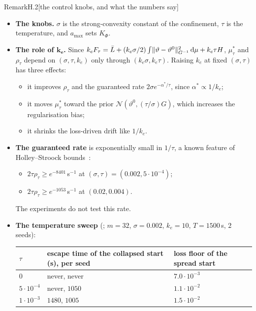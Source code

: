 \begin{rmk}{Remark}{H.2}[the control knobs, and what the numbers say]
\leavevmode
\begin{itemize}
  \item \textbf{The knobs.} $\sigma$ is the strong-convexity constant of the confinement, $\tau$ is the temperature,
  and $a_{\max}$ sets $K_\Phi$.
  \item \textbf{The role of $\bm{k_e}$.} Since
  $k_e F_\tau = \bar L + (k_e\sigma/2)\int\lVert \vartheta - \vartheta^0\rVert^2_{G^{-1}}\,\mathrm{d}\mu + k_e\tau H$,
  $\mu^*_\tau$ and $\rho_\tau$ depend on $(\sigma, \tau, k_e)$ only through $(k_e\sigma, k_e\tau)$. Raising $k_e$ at
  fixed $(\sigma, \tau)$ has three effects:
  \begin{itemize}
    \item it improves $\rho_\tau$ and the guaranteed rate $2\sigma e^{-\alpha^*/\tau}$, since $\alpha^* \propto 1/k_e$;
    \item it moves $\mu^*_\tau$ toward the prior $\mathcal{N}(\vartheta^0, (\tau/\sigma)G)$, which increases the
    regularisation bias;
    \item it shrinks the loss-driven drift like $1/k_e$.
  \end{itemize}
  \item \textbf{The guaranteed rate} is exponentially small in $1/\tau$, a known feature of Holley--Stroock
  bounds~\cite{hs1987}:
  \begin{itemize}
    \item $2\tau\rho_\tau \ge e^{-8401}$\,s$^{-1}$ at $(\sigma, \tau) = (0.002, 5\cdot 10^{-4})$;
    \item $2\tau\rho_\tau \ge e^{-1053}$\,s$^{-1}$ at $(0.02, 0.004)$.
  \end{itemize}
  The experiments do not test this rate.
  \item \textbf{The temperature sweep} (; $m = 32$, $\sigma = 0.002$, $k_e = 10$,
  $T = 1500$\,s, $2$ seeds):
  \begin{center}
    \small
    \begin{tabular}{l>{\centering\arraybackslash}p{4.4cm}>{\centering\arraybackslash}p{3.4cm}}
      \toprule
      $\tau$ & escape time of the collapsed start (s), per seed & loss floor of the spread start \\
      \midrule
      $0$ & never, never & $7.0\cdot 10^{-3}$ \\
      $5\cdot 10^{-4}$ & never, $1050$ & $1.1\cdot 10^{-2}$ \\
      $1\cdot 10^{-3}$ & $1480$, $1005$ & $1.5\cdot 10^{-2}$ \\

\end{tabular}
\end{center}
\end{itemize}
\end{rmk}

